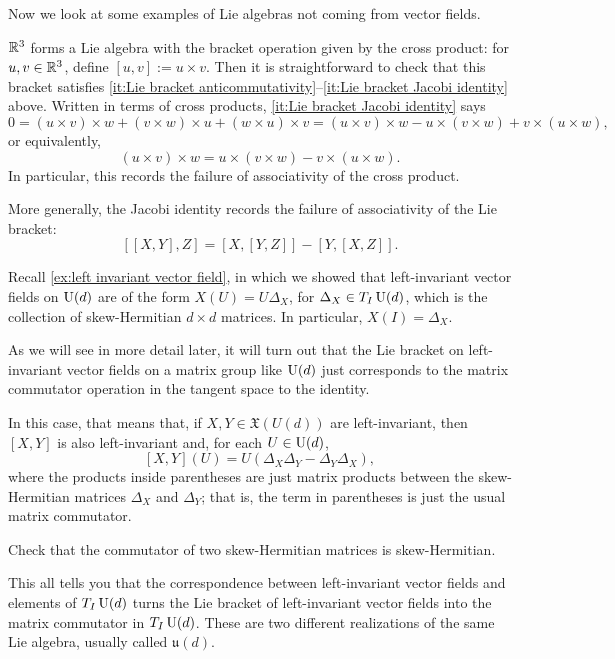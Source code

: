 Now we look at some examples of Lie algebras not coming from vector fields.

\begin{example}
	$\mathbb{R}^3$ forms a Lie algebra with the bracket operation given by the cross product: for $u,v \in \mathbb{R}^3$, define $[u,v] := u \times v$. Then it is straightforward to check that this bracket satisfies \ref{it:Lie bracket anticommutativity}--\ref{it:Lie bracket Jacobi identity} above. Written in terms of cross products, \ref{it:Lie bracket Jacobi identity} says
	\[
		0 = (u \times v) \times w + (v \times w) \times u + (w \times u) \times v = (u \times v) \times w - u \times (v \times w) + v \times (u \times w),
	\]
	or equivalently,
	\[
		(u \times v) \times w = u \times (v \times w) - v \times (u \times w).
	\]
	In particular, this records the failure of associativity of the cross product.
\end{example}

More generally, the Jacobi identity records the failure of associativity of the Lie bracket:
\[
	[[X,Y],Z] = [X,[Y,Z]] - [Y,[X,Z]].
\]

\begin{example}
	Recall \cref{ex:left invariant vector field}, in which we showed that left-invariant vector fields on $\operatorname{U}(d)$ are of the form $X(U) = U \Delta_X$, for $\Delta_X \in T_I\operatorname{U}(d)$, which is the collection of skew-Hermitian $d \times d$ matrices. In particular, $X(I) = \Delta_X$.
	
	As we will see in more detail later, it will turn out that the Lie bracket on left-invariant vector fields on a matrix group like $\operatorname{U}(d)$ just corresponds to the matrix commutator operation in the tangent space to the identity. 
	
	In this case, that means that, if $X,Y \in \mathfrak{X}(U(d))$ are left-invariant, then $[X,Y]$ is also left-invariant and, for each $U \in \operatorname{U}(d)$,
	\[
		[X,Y](U) = U(\Delta_X \Delta_Y - \Delta_Y \Delta_X),
	\]
	where the products inside parentheses are just matrix products between the skew-Hermitian matrices $\Delta_X$ and $\Delta_Y$; that is, the term in parentheses is just the usual matrix commutator.
	
	\begin{exercise}
		Check that the commutator of two skew-Hermitian matrices is skew-Hermitian.
	\end{exercise}
	
	This all tells you that the correspondence between left-invariant vector fields and elements of $T_I\operatorname{U}(d)$ turns the Lie bracket of left-invariant vector fields into the matrix commutator in $T_I \operatorname{U}(d)$. These are two different realizations of the same Lie algebra, usually called $\mathfrak{u}(d)$.
\end{example}

